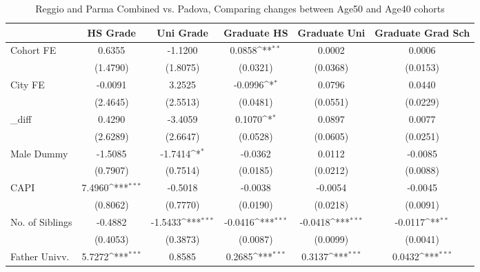 \begin{table}[htbp]\centering
\def\sym#1{\ifmmode^{#1}\else\(^{#1}\)\fi}
\caption{Reggio and Parma Combined vs. Padova, Comparing changes between Age50 and Age40 cohorts}
\begin{tabular}{l*{5}{c}}
\toprule
            &\multicolumn{1}{c}{HS Grade}&\multicolumn{1}{c}{Uni Grade}&\multicolumn{1}{c}{Graduate HS}&\multicolumn{1}{c}{Graduate Uni}&\multicolumn{1}{c}{Graduate Grad Sch}\\
\midrule
Cohort FE   &      0.6355         &     -1.1200         &      0.0858\sym{**} &      0.0002         &      0.0006         \\
            &    (1.4790)         &    (1.8075)         &    (0.0321)         &    (0.0368)         &    (0.0153)         \\
\addlinespace
City FE     &     -0.0091         &      3.2525         &     -0.0996\sym{*}  &      0.0796         &      0.0440         \\
            &    (2.4645)         &    (2.5513)         &    (0.0481)         &    (0.0551)         &    (0.0229)         \\
\addlinespace
\_diff       &      0.4290         &     -3.4059         &      0.1070\sym{*}  &      0.0897         &      0.0077         \\
            &    (2.6289)         &    (2.6647)         &    (0.0528)         &    (0.0605)         &    (0.0251)         \\
\addlinespace
Male Dummy  &     -1.5085         &     -1.7414\sym{*}  &     -0.0362         &      0.0112         &     -0.0085         \\
            &    (0.7907)         &    (0.7514)         &    (0.0185)         &    (0.0212)         &    (0.0088)         \\
\addlinespace
CAPI        &      7.4960\sym{***}&     -0.5018         &     -0.0038         &     -0.0054         &     -0.0045         \\
            &    (0.8062)         &    (0.7770)         &    (0.0190)         &    (0.0218)         &    (0.0091)         \\
\addlinespace
No. of Siblings&     -0.4882         &     -1.5433\sym{***}&     -0.0416\sym{***}&     -0.0418\sym{***}&     -0.0117\sym{**} \\
            &    (0.4053)         &    (0.3873)         &    (0.0087)         &    (0.0099)         &    (0.0041)         \\
\addlinespace
Father Univv.&      5.7272\sym{***}&      0.8585         &      0.2685\sym{***}&      0.3137\sym{***}&      0.0432\sym{***}\\

\end{tabular}
\end{table}
